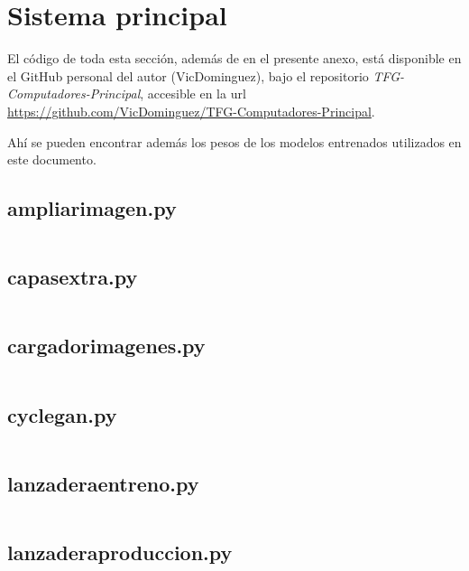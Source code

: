 \documentclass[./main.tex]{subfiles}
\begin{document}
\section{Sistema principal}
\label{anexo:sistema_principal}

El código de toda esta sección, además de en el presente anexo, está disponible en el GitHub personal del autor (VicDominguez),
bajo el repositorio \textit{TFG-Computadores-Principal}, 
accesible en la url \url{https://github.com/VicDominguez/TFG-Computadores-Principal}. \newline

Ahí se pueden encontrar además los pesos de los modelos entrenados utilizados en este documento.

\subsection{ampliar\textunderscore imagen.py}
\inputminted[fontsize=\footnotesize]{python}{./codigo/principal/ampliar_imagen.py}

\subsection{capas\textunderscore extra.py}
\inputminted[fontsize=\footnotesize]{python}{./codigo/principal/capas_extra.py}

\subsection{cargador\textunderscore imagenes.py}
\inputminted[fontsize=\footnotesize]{python}{./codigo/principal/cargador_imagenes.py}

\subsection{cyclegan.py}
\inputminted[fontsize=\footnotesize]{python}{./codigo/principal/cyclegan.py}

\subsection{lanzadera\textunderscore entreno.py}
\inputminted[fontsize=\footnotesize]{python}{./codigo/principal/lanzadera_entreno.py}

\subsection{lanzadera\textunderscore produccion.py}
\inputminted[fontsize=\footnotesize]{python}{./codigo/principal/lanzadera_produccion.py}
\end{document}
